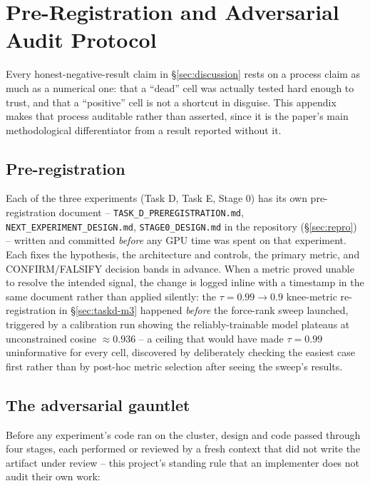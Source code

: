\appendix
\section{Pre-Registration and Adversarial Audit Protocol}
\label{sec:appendix-methodology}

Every honest-negative-result claim in \S\ref{sec:discussion} rests on a
process claim as much as a numerical one: that a ``dead'' cell was actually
tested hard enough to trust, and that a ``positive'' cell is not a
shortcut in disguise. This appendix makes that process auditable rather
than asserted, since it is the paper's main methodological differentiator
from a result reported without it.

\subsection{Pre-registration}
\label{sec:appendix-prereg}

Each of the three experiments (Task D, Task E, Stage 0) has its own
pre-registration document -- \texttt{TASK\_D\_PREREGISTRATION.md},
\texttt{NEXT\_EXPERIMENT\_DESIGN.md}, \texttt{STAGE0\_DESIGN.md} in the
repository (\S\ref{sec:repro}) -- written and committed \emph{before} any
GPU time was spent on that experiment. Each fixes the hypothesis, the
architecture and controls, the primary metric, and CONFIRM/FALSIFY
decision bands in advance. When a metric proved unable to resolve the
intended signal, the change is logged inline with a timestamp in the same
document rather than applied silently: the $\tau{=}0.99\to0.9$ knee-metric
re-registration in \S\ref{sec:taskd-m3} happened \emph{before} the
force-rank sweep launched, triggered by a calibration run showing the
reliably-trainable model plateaus at unconstrained cosine
$\approx0.936$ -- a ceiling that would have made $\tau{=}0.99$
uninformative for every cell, discovered by deliberately checking the
easiest case first rather than by post-hoc metric selection after seeing
the sweep's results.

\subsection{The adversarial gauntlet}
\label{sec:appendix-gauntlet}

Before any experiment's code ran on the cluster, design and code passed
through four stages, each performed or reviewed by a fresh context that
did not write the artifact under review -- this project's standing rule
that an implementer does not audit their own work:

